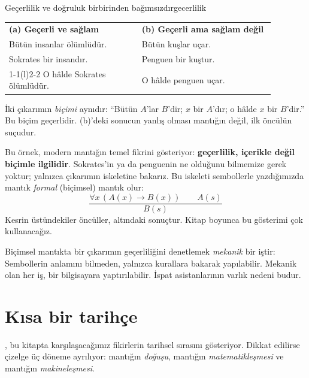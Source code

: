 \begin{ornek}{Geçerlilik ve doğruluk birbirinden bağımsızdır}{gecerlilik}
\begin{center}
\renewcommand{\arraystretch}{1.3}
\begin{tabular}{p{0.44\linewidth} p{0.44\linewidth}}
\textbf{(a) Geçerli ve sağlam}
& \textbf{(b) Geçerli ama sağlam değil} \\
Bütün insanlar ölümlüdür. & Bütün kuşlar uçar. \\
Sokrates bir insandır. & Penguen bir kuştur. \\
\cmidrule(r){1-1}\cmidrule(l){2-2}
O hâlde Sokrates ölümlüdür. & O hâlde penguen uçar. \\
\end{tabular}
\end{center}
İki çıkarımın \emph{biçimi} aynıdır: ``Bütün $A$'lar $B$'dir; $x$ bir
$A$'dır; o hâlde $x$ bir $B$'dir.'' Bu biçim geçerlidir. (b)'deki sonucun
yanlış olması mantığın değil, ilk öncülün suçudur.
\end{ornek}

Bu örnek, modern mantığın temel fikrini gösteriyor: \textbf{geçerlilik,
içerikle değil biçimle ilgilidir}. Sokrates'in ya da penguenin ne olduğunu
bilmemize gerek yoktur; yalnızca çıkarımın iskeletine bakarız. Bu iskeleti
sembollerle yazdığımızda mantık \emph{formal} (biçimsel) mantık olur:
\[
  \frac{\forall x\,(A(x) \to B(x)) \qquad A(s)}{B(s)}
\]
Kesrin üstündekiler öncüller, altındaki sonuçtur. Kitap boyunca bu gösterimi
çok kullanacağız.

\begin{onemlifikir}
Biçimsel mantıkta bir çıkarımın geçerliliğini denetlemek \emph{mekanik} bir
iştir: Sembollerin anlamını bilmeden, yalnızca kurallara bakarak yapılabilir.
Mekanik olan her iş, bir bilgisayara yaptırılabilir. İspat asistanlarının
varlık nedeni budur.
\end{onemlifikir}

\section{Kısa bir tarihçe}\label{sec:tarihce}

, bu kitapta karşılaşacağımız fikirlerin
tarihsel sırasını gösteriyor. Dikkat edilirse çizelge üç döneme ayrılıyor:
mantığın \emph{doğuşu}, mantığın \emph{matematikleşmesi} ve mantığın
\emph{makineleşmesi}.

